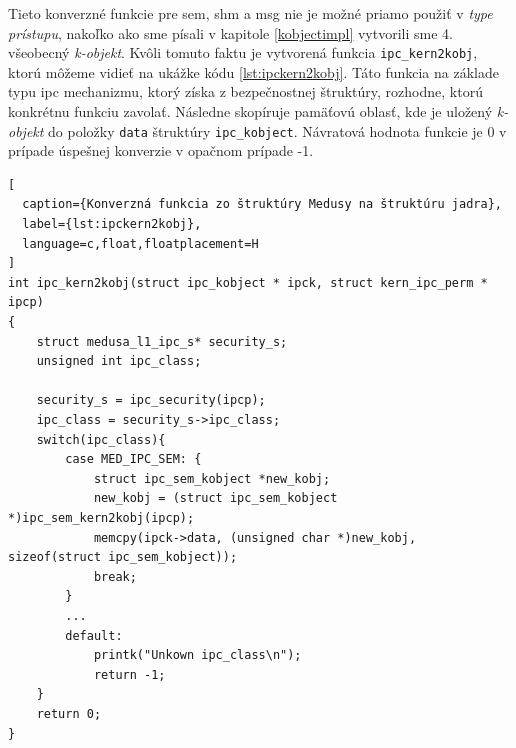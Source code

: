 Tieto konverzné funkcie pre \acrshort{sem}, \acrshort{shm} a \acrshort{msg} nie je možné priamo použiť v \textit{type prístupu}, nakoľko ako sme písali v kapitole \ref{kobjectimpl} vytvorili sme 4. všeobecný \textit{k-objekt}. Kvôli tomuto faktu je vytvorená funkcia \texttt{ipc\_kern2kobj}, ktorú môžeme vidieť na ukážke kódu \ref{lst:ipckern2kobj}. Táto funkcia na základe typu \acrshort{ipc} mechanizmu, ktorý získa z  bezpečnostnej štruktúry, rozhodne, ktorú konkrétnu funkciu zavolať. Následne skopíruje pamäťovú oblasť, kde je uložený \textit{k-objekt} do položky \texttt{data} štruktúry \texttt{ipc\_kobject}. Návratová hodnota funkcie je 0 v prípade úspešnej konverzie v opačnom prípade -1.
\begin{lstlisting}[
  caption={Konverzná funkcia zo štruktúry Medusy na štruktúru jadra},
  label={lst:ipckern2kobj},
  language=c,float,floatplacement=H
]
int ipc_kern2kobj(struct ipc_kobject * ipck, struct kern_ipc_perm * ipcp)
{
	struct medusa_l1_ipc_s* security_s;
	unsigned int ipc_class;

	security_s = ipc_security(ipcp);
	ipc_class = security_s->ipc_class;
	switch(ipc_class){
		case MED_IPC_SEM: {
			struct ipc_sem_kobject *new_kobj;
			new_kobj = (struct ipc_sem_kobject *)ipc_sem_kern2kobj(ipcp);
			memcpy(ipck->data, (unsigned char *)new_kobj, sizeof(struct ipc_sem_kobject));
			break;
		}
		...
		default:
			printk("Unkown ipc_class\n");
			return -1;		
	}
	return 0;
}
\end{lstlisting}
